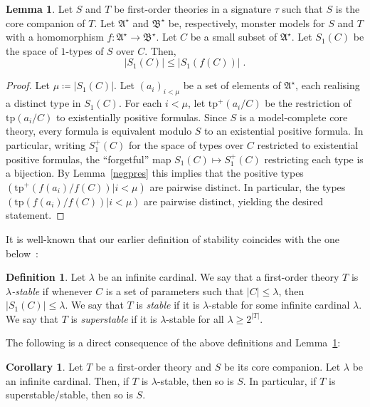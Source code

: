 \documentclass{amsart}
\theoremstyle{definition}
\newtheorem{lemma}[theorem]{Lemma}
\newtheorem{corollary}[theorem]{Corollary}
\newtheorem{definition}[theorem]{Definition}
\theoremstyle{remark}
\numberwithin{equation}{section}
\newcommand{\fa}{\mathfrak{A}}
\newcommand{\fb}{\mathfrak{B}}
\begin{document}
\begin{lemma}\label{lem:typecounting} Let $S$ and $T$ be first-order theories in a {signature} $\tau$ such that $S$ is the core companion  of $T$. Let $\fa^\star$ and $\fb^\star$ be, respectively, monster models for $S$ and $T$ with a homomorphism $f \colon \fa^\star\to \fb^\star$. Let $C$ be a small subset of $\fa^\star$. Let $S_1(C)$ be the space of $1$-types of $S$ over $C$. Then, 
\[|S_1(C)|\leq |S_1(f(C))|\;.\]
\end{lemma}
\begin{proof} Let $\mu\coloneqq |S_1(C)|$. Let $(a_i)_{i< \mu}$ be a set of elements of $\fa^\star$, each realising a distinct type in $S_1(C)$. For each $i<\mu$, let $\mathrm{tp}^+(a_i/C)$ be the restriction of $\mathrm{tp}(a_i/C)$ to existentially positive formulas. Since $S$ is a model-complete core theory, every formula is equivalent modulo $S$ to an existential positive formula. In particular,  writing $S_1^+(C)$ for the space of types over $C$ restricted to existential positive formulas, the ``forgetful'' map $S_1(C)\mapsto S^+_1(C)$ restricting each type is a bijection.
By Lemma~\ref{negpres} this implies that the positive types $(\mathrm{tp}^+(f(a_i)/f(C))\vert i< \mu)$ are pairwise distinct. In particular, the types $(\mathrm{tp}(f(a_i)/f(C))\vert i< \mu)$ are pairwise distinct, yielding the desired statement.
\end{proof}



It is well-known that our earlier definition of stability coincides with the one below~\cite{shelah1990classification}:

\begin{definition}\label{def:superstab} Let $\lambda$ be an infinite cardinal. We say that a first-order theory $T$ is $\lambda$\textit{-stable} if whenever $C$ is a set of parameters such that $|C|\leq \lambda$, then $|S_1(C)|\leq \lambda$. We say that $T$ is \textit{stable} if it is $\lambda$-stable for some infinite cardinal $\lambda$. We say that $T$ is \textit{superstable} if it is $\lambda$-stable for all $\lambda\geq 2^{|T|}$.
\end{definition}

The following is a direct consequence of the above definitions and Lemma~\ref{lem:typecounting}:
\begin{corollary}\label{cor:supstabpres} Let $T$ be a first-order theory and $S$ be its core companion. Let $\lambda$ be an infinite cardinal. Then, if $T$ is $\lambda$-stable, then so is $S$. In particular, if $T$ is superstable/stable, then so is $S$.
\end{corollary}
\end{document}
